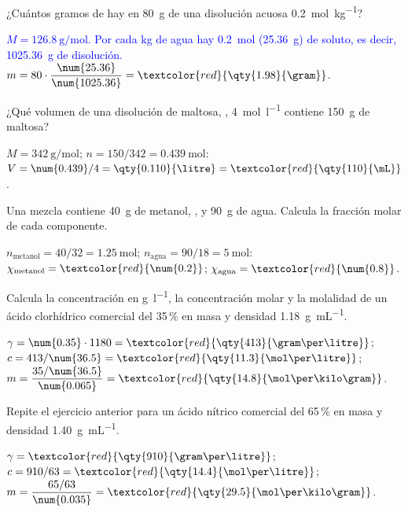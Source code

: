 \begin{exercise}
    ¿Cuántos gramos de  hay en \qty{80}{\gram} de una disolución acuosa \qty{0.2}{\mol\per\kilo\gram}?
    \begin{solu}
        \textcolor{blue}{\(M = \qty{126.8}{\gram\per\mol}\). Por cada kg de agua hay \qty{0.2}{\mol} (\qty{25.36}{\gram}) de soluto,
        es decir, \qty{1025.36}{\gram} de disolución.} \(m = 80 \cdot \dfrac{\num{25.36}}{\num{1025.36}} = \textcolor{red}{\qty{1.98}{\gram}}\).
    \end{solu}
\end{exercise}

\begin{exercise}
    ¿Qué volumen de una disolución de maltosa, , \qty{4}{\mol\per\litre} contiene \qty{150}{\gram} de maltosa?
    \begin{solu}
        \(M = \qty{342}{\gram\per\mol}\); \(n = 150/342 = \qty{0.439}{\mol}\): \(V = \num{0.439}/4 = \qty{0.110}{\litre} = \textcolor{red}{\qty{110}{\mL}}\).
    \end{solu}
\end{exercise}

\begin{exercise}
    Una mezcla contiene \qty{40}{\gram} de metanol, , y \qty{90}{\gram} de agua. Calcula la fracción molar de cada
    componente.
    \begin{solu}
        \(n_{\text{metanol}} = 40/32 = \qty{1.25}{\mol}\); \(n_{\text{agua}} = 90/18 = \qty{5}{\mol}\):
        \(\chi_{\text{metanol}} = \textcolor{red}{\num{0.2}}\); \(\chi_{\text{agua}} = \textcolor{red}{\num{0.8}}\).
    \end{solu}
\end{exercise}

\begin{exercise}
    Calcula la concentración en \unit{\gram\per\litre}, la concentración molar y la molalidad de un ácido clorhídrico comercial
    del 35\,\% en masa y densidad \qty{1.18}{\gram\per\mL}.
    \begin{solu}
        \(\gamma = \num{0.35} \cdot 1180 = \textcolor{red}{\qty{413}{\gram\per\litre}}\); \(c = 413/\num{36.5} = \textcolor{red}{\qty{11.3}{\mol\per\litre}}\);
        \(m = \dfrac{35/\num{36.5}}{\num{0.065}} = \textcolor{red}{\qty{14.8}{\mol\per\kilo\gram}}\).
    \end{solu}
\end{exercise}

\begin{exercise}
    Repite el ejercicio anterior para un ácido nítrico comercial del 65\,\% en masa y densidad \qty{1.40}{\gram\per\mL}.
    \begin{solu}
        \(\gamma = \textcolor{red}{\qty{910}{\gram\per\litre}}\); \(c = 910/63 = \textcolor{red}{\qty{14.4}{\mol\per\litre}}\);
        \(m = \dfrac{65/63}{\num{0.035}} = \textcolor{red}{\qty{29.5}{\mol\per\kilo\gram}}\).
    \end{solu}
\end{exercise}

